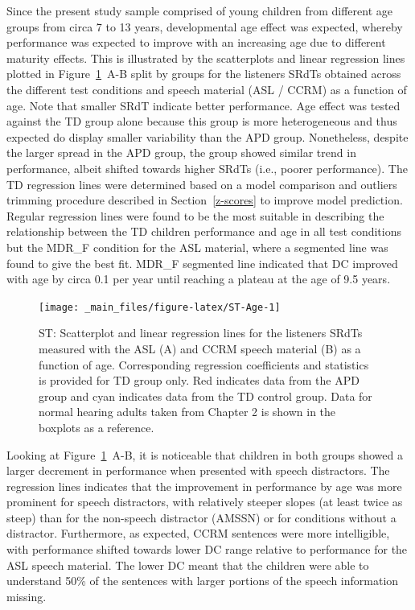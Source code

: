 \documentclass[a4paper, twoside]{templates/ociamthesis}
\begin{document}
Since the present study sample comprised of young children from different age groups from circa 7 to 13 years, developmental age effect was expected, whereby performance was expected to improve with an increasing age due to different maturity effects. This is illustrated by the scatterplots and linear regression lines plotted in Figure~\ref{fig:ST-Age}~A-B split by groups for the listeners SRdTs obtained across the different test conditions and speech material (ASL / CCRM) as a function of age. Note that smaller SRdT indicate better performance. Age effect was tested against the TD group alone because this group is more heterogeneous and thus expected do display smaller variability than the APD group. Nonetheless, despite the larger spread in the APD group, the group showed similar trend in performance, albeit shifted towards higher SRdTs (i.e., poorer performance). The TD regression lines were determined based on a model comparison and outliers trimming procedure described in Section~\ref{z-scores} to improve model prediction. Regular regression lines were found to be the most suitable in describing the relationship between the TD children performance and age in all test conditions but the MDR\_F condition for the ASL material, where a segmented line was found to give the best fit. MDR\_F segmented line indicated that DC improved with age by circa 0.1 per year until reaching a plateau at the age of 9.5 years.\\

\begin{figure}[h]

{\centering \texttt{[image: \_main\_files/figure-latex/ST-Age-1]} 

}

\caption{ST: Scatterplot and linear regression lines for the listeners SRdTs measured with the ASL (A) and CCRM speech material (B) as a function of age. Corresponding regression coefficients and statistics is provided for TD group only. Red indicates data from the APD group and cyan indicates data from the TD control group. Data for normal hearing adults taken from Chapter 2 is shown in the boxplots as a reference.}\label{fig:ST-Age}
\end{figure}

Looking at Figure~\ref{fig:ST-Age}~A-B, it is noticeable that children in both groups showed a larger decrement in performance when presented with speech distractors. The regression lines indicates that the improvement in performance by age was more prominent for speech distractors, with relatively steeper slopes (at least twice as steep) than for the non-speech distractor (AMSSN) or for conditions without a distractor. Furthermore, as expected, CCRM sentences were more intelligible, with performance shifted towards lower DC range relative to performance for the ASL speech material. The lower DC meant that the children were able to understand 50\% of the sentences with larger portions of the speech information missing.\\
\end{document}
